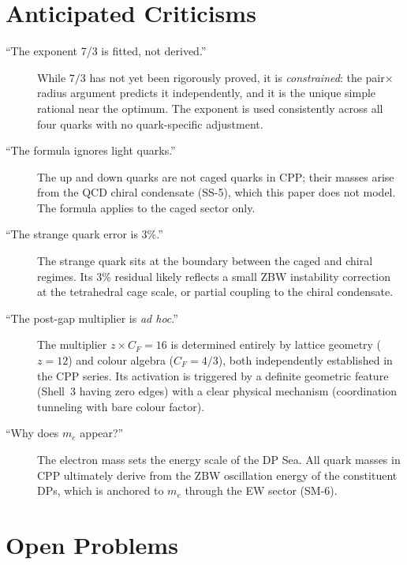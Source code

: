 \documentclass[11pt,letterpaper]{article}
\begin{document}
\section{Anticipated Criticisms}
\label{sec:criticisms}

\begin{description}
\item[``The exponent 7/3 is fitted, not derived.'']
  While $7/3$ has not yet been rigorously proved, it is
  \emph{constrained}: the pair$\times$radius argument predicts
  it independently, and it is the unique simple rational near the
  optimum.  The exponent is used consistently across all four quarks
  with no quark-specific adjustment.

\item[``The formula ignores light quarks.'']
  The up and down quarks are not caged quarks in CPP; their masses
  arise from the QCD chiral condensate (SS-5), which this paper
  does not model.  The formula applies to the caged sector only.

\item[``The strange quark error is 3\%.'']
  The strange quark sits at the boundary between the caged and
  chiral regimes.  Its 3\% residual likely reflects a small
  ZBW instability correction at the tetrahedral cage scale, or
  partial coupling to the chiral condensate.

\item[``The post-gap multiplier is \emph{ad hoc}.'']
  The multiplier $z \times C_F = 16$ is determined entirely by
  lattice geometry ($z\!=\!12$) and colour algebra ($C_F\!=\!4/3$),
  both independently established in the CPP series.  Its activation
  is triggered by a definite geometric feature (Shell~3 having zero
  edges) with a clear physical mechanism (coordination tunneling
  with bare colour factor).

\item[``Why does $m_e$ appear?'']
  The electron mass sets the energy scale of the DP Sea.  All quark
  masses in CPP ultimately derive from the ZBW oscillation energy
  of the constituent DPs, which is anchored to $m_e$ through the
  EW sector (SM-6).
\end{description}

\section{Open Problems}
\label{sec:open}
\end{document}
